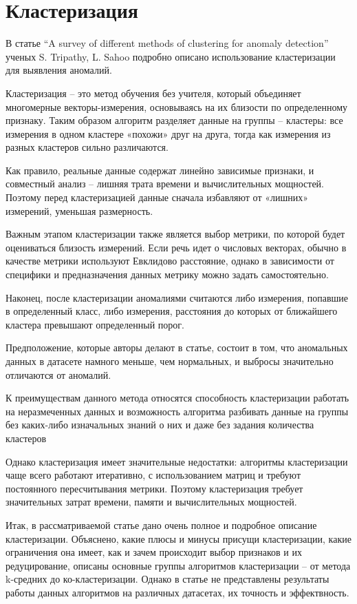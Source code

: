 \documentclass[14pt, letterpaper]{extarticle}
\begin{document}
\section{Кластеризация}

В статье “A survey of different methods of clustering for anomaly detection” ученых S. Tripathy, L. Sahoo \cite{tripathy2015survey} подробно описано использование кластеризации для выявления аномалий.

Кластеризация – это метод обучения без учителя, который объединяет многомерные векторы-измерения, основываясь на их близости по определенному признаку. Таким образом алгоритм разделяет данные на группы – кластеры: все измерения в одном кластере «похожи» друг на друга, тогда как измерения из разных кластеров сильно различаются. 

Как правило, реальные данные содержат линейно зависимые признаки, и совместный анализ – лишняя трата времени и вычислительных мощностей. Поэтому перед кластеризацией данные сначала избавляют от «лишних» измерений, уменьшая размерность. 

Важным этапом кластеризации также является выбор метрики, по которой будет оцениваться близость измерений. Если речь идет о числовых векторах, обычно в качестве метрики используют Евклидово расстояние, однако в зависимости от специфики и предназначения данных метрику можно задать самостоятельно.

Наконец, после кластеризации аномалиями считаются либо измерения, попавшие в определенный класс, либо измерения, расстояния до которых от ближайшего кластера превышают определенный порог.

Предположение, которые авторы делают в статье, состоит в том, что аномальных данных в датасете намного меньше, чем нормальных, и выбросы значительно отличаются от аномалий.

К преимуществам данного метода относятся способность кластеризации работать на неразмеченных данных и возможность алгоритма разбивать данные на группы без каких-либо изначальных знаний о них и даже без задания количества кластеров

Однако кластеризация имеет значительные недостатки: алгоритмы кластеризации чаще всего работают итеративно, с использованием матриц и требуют постоянного пересчитывания метрики. Поэтому кластеризация требует значительных затрат времени, памяти и вычислительных мощностей. 

Итак, в рассматриваемой статье дано очень полное и подробное описание кластеризации. Объяснено, какие плюсы и минусы присущи кластеризации, какие ограничения она имеет, как и зачем происходит выбор признаков и их редуцирование, описаны основные группы алгоритмов кластеризации – от метода k-средних до ко-кластеризации. Однако в статье не представлены результаты работы данных алгоритмов на различных датасетах, их точность и эффектвность. 
\end{document}
